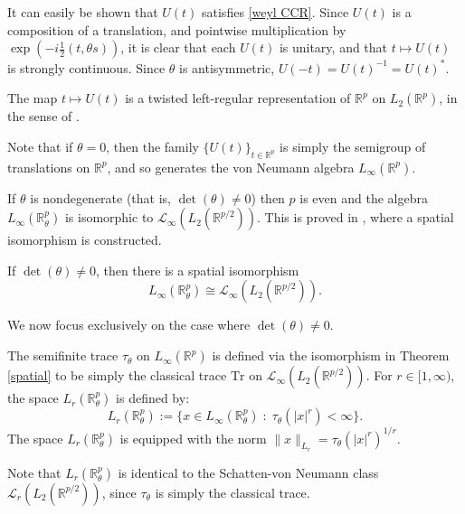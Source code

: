     \begin{rem}
        It can easily be shown that $U(t)$ satisfies \eqref{weyl CCR}. Since $U(t)$ is a composition of a translation, and pointwise multiplication by $\exp\left(-i\frac{1}{2}(t,\theta s)\right)$, it is clear that each $U(t)$ is unitary, and that $t\mapsto U(t)$ is strongly continuous. Since $\theta$ is antisymmetric, $U(-t) = U(t)^{-1} = U(t)^*$.
        
        The map $t\mapsto U(t)$ is a twisted left-regular representation of $\mathbb{R}^p$ on $L_2(\mathbb{R}^p)$, in the sense of \cite{Echterhoff-2008}.
        
        Note that if $\theta = 0$, then the family $\{U(t)\}_{t \in \mathbb{R}^p}$ is simply the semigroup of translations on $\mathbb{R}^p$, and so generates the von Neumann algebra $L_\infty(\mathbb{R}^p)$. 
    \end{rem}
    
    If $\theta$ is nondegenerate (that is, $\det(\theta) \neq 0$) then $p$ is even and the algebra $L_\infty(\mathbb{R}^p_\theta)$ is isomorphic to $\mathcal{L}_\infty(L_2(\mathbb{R}^{p/2}))$. 
    This is proved in \cite{LeSZ-cwikel}, where a spatial isomorphism is constructed.    
    \begin{thm}\label{spatial}
        If $\det(\theta) \neq 0$, then there is a spatial isomorphism
        \begin{equation*}
            L_\infty(\mathbb{R}^p_\theta)\cong \mathcal{L}_\infty(L_2(\mathbb{R}^{p/2})).
        \end{equation*}
    \end{thm}
    
    We now focus exclusively on the case where $\det(\theta) \neq 0$.
    \begin{defi}
        The semifinite trace $\tau_\theta$ on $L_\infty(\mathbb{R}^p)$ is defined via the isomorphism in Theorem \ref{spatial} to be simply the classical
        trace $\mathrm{Tr}$ on $\mathcal{L}_\infty(L_2(\mathbb{R}^{p/2}))$. For $r \in [1,\infty)$, the space $L_r(\mathbb{R}^p_\theta)$ is defined by:
        \begin{equation*}
            L_r(\mathbb{R}^p_\theta) := \{x \in L_\infty(\mathbb{R}^p_\theta)\;:\;\tau_\theta(|x|^r) < \infty\}.
        \end{equation*}
        The space $L_{r}(\mathbb{R}^p_\theta)$ is equipped with the norm $\|x\|_{L_r} = \tau_\theta(|x|^r)^{1/r}$.
    \end{defi}
    Note that $L_r(\mathbb{R}^p_\theta)$ is identical to the Schatten-von Neumann class $\mathcal{L}_r(L_2(\mathbb{R}^{p/2}))$, since $\tau_\theta$ is simply the classical trace. 
    
